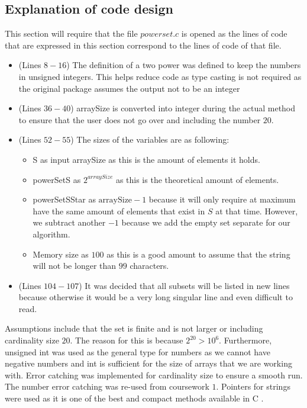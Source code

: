 \documentclass[a4paper]{article}
\theoremstyle{plain}
\theoremstyle{definition}
\theoremstyle{remark}
\begin{document}
\subsection{Explanation of code design}
This section will require that the file $powerset.c$ is opened as the lines of code that are expressed in this section correspond to the lines of code of that file.
\begin{itemize}
	\item (Lines $8-16$) The definition of a two power was defined to keep the numbers in unsigned integers. This helps reduce code as type casting is not required as the original package assumes the output not to be an integer
	\item (Lines $36-40$) arraySize is converted into integer during the actual method to ensure that the user does not go over and including the number $20$. 
	\item (Lines $52-55$) The sizes of the variables are as following:
		\begin{itemize}
			\item S as input arraySize as this is the amount of elements it holds.
			\item powerSetS as $2^{arraySize}$ as this is the theoretical amount of elements.
			\item powerSetSStar as $\text{arraySize}-1$ because it will only require at maximum have the same amount of elements that exist in $S$ at that time. However, we subtract another $-1$ because we add the empty set separate for our algorithm.
			\item Memory size as $100$ as this is a good amount to assume that the string will not be longer than $99$ characters.
		\end{itemize}
	\item (Lines $104-107$) It was decided that all subsets will be listed in new lines because otherwise it would be a very long singular line and even difficult to read.
\end{itemize}
Assumptions include that the set is finite and is not larger or including cardinality size $20$. The reason for this is because $2^{20}>10 ^{6}$. Furthermore, unsigned int was used as the general type for numbers as we cannot have negative numbers and int is sufficient for the size of arrays that we are working with. Error catching was implemented for cardinality size to ensure a smooth run. The number error catching was re-used from coursework $1$. Pointers for strings were used as it is one of the best and compact methods available in C \cite{pointer} \cite{pointer2}.
\newpage
\end{document}
